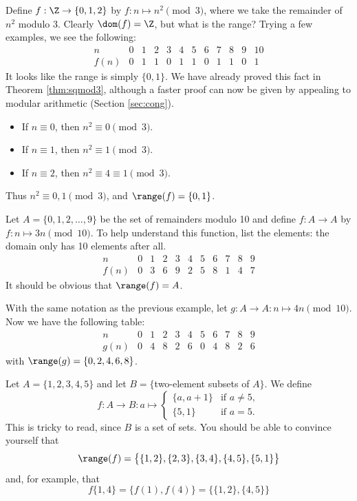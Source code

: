 \begin{examples}
  \item Define $f:\Z\to\{0,1,2\}$ by $f:n\mapsto n^2\pmod 3$, where we take the remainder of $n^2$ modulo 3. Clearly $\dom(f)=\Z$, but what is the range? Trying a few examples, we see the following:
  \[\begin{array}{c|ccccccccccc}
  n&0&1&2&3&4&5&6&7&8&9&10\\\hline
  f(n)&0&1&1&0&1&1&0&1&1&0&1
  \end{array}\]
  It looks like the range is simply $\{0,1\}$. We have already proved this fact in Theorem \ref{thm:sqmod3}, although a faster proof can now be given by appealing to modular arithmetic (Section \ref{sec:cong}).
  \begin{itemize}\setlength{\itemsep}{0pt}
    \item[] If $n\equiv 0$, then $n^2\equiv 0\pmod 3$.
    \item[] If $n\equiv 1$, then $n^2\equiv 1\pmod 3$.
    \item[] If $n\equiv 2$, then $n^2\equiv 4\equiv 1\pmod 3$.
  \end{itemize}
  Thus $n^2\equiv 0,1\pmod 3$, and $\range(f)=\{0,1\}$.
  \item\label{ex:functmod1} Let $A=\{0,1,2,\ldots,9\}$ be the set of remainders modulo 10 and define $f:A\to A$ by $f:n\mapsto 3n\pmod{10}$. To help understand this function, list the elements: the domain only has 10 elements after all.
  \[\begin{array}{c|cccccccccc}
  n&0&1&2&3&4&5&6&7&8&9\\\hline
  f(n)&0&3&6&9&2&5&8&1&4&7
  \end{array}\]
  It should be obvious that $\range(f)=A$.
  \item\label{ex:functmod2} With the same notation as the previous example, let $g:A\to A:n\mapsto 4n\pmod{10}$. Now we have the following table:
  \[\begin{array}{c|cccccccccc}
  n&0&1&2&3&4&5&6&7&8&9\\\hline
  g(n)&0&4&8&2&6&0&4&8&2&6
  \end{array}\]
  with $\range(g)=\{0,2,4,6,8\}$.
  \item Let $A=\{1,2,3,4,5\}$ and let $B=\{$two-element subsets of $A\}$. We define
  \[f:A\to B:a\mapsto\begin{cases}
  \{a,a+1\}&\text{if }a\neq 5,\\
  \{5,1\}&\text{if }a=5.
  \end{cases}\]
  This is tricky to read, since $B$ is a set of sets. You should be able to convince yourself that
  \[\range(f)=\big\{\{1,2\},\{2,3\},\{3,4\},\{4,5\},\{5,1\}\big\}\]
  and, for example, that
  \[f\big\{1,4\big\}=\big\{f(1),f(4)\big\}=\big\{\{1,2\},\{4,5\}\big\}\]
\end{examples}

